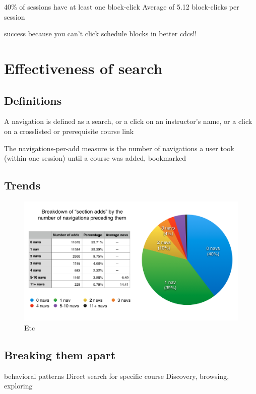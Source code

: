 40\% of sessions have at least one block-click
Average of 5.12 block-clicks per session

success because you can't click schedule blocks in better cdcs!!

\section{Effectiveness of search}

\subsection{Definitions}

A navigation is defined as
a search, or
a click on an instructor’s name, or
a click on a crosslisted or prerequisite course link

The navigations-per-add measure is
the number of navigations a user took (within one session) until a course was added, bookmarked

\subsection{Trends}

\begin{figure}
  \centering
  \includegraphics[width=1.0\textwidth]{images/graph/combined_navs}

  \caption{Etc}
  \label{fig:searchtypes}
\end{figure}

\subsection{Breaking them apart}

  behavioral patterns
  Direct search for specific course
  Discovery, browsing, exploring

